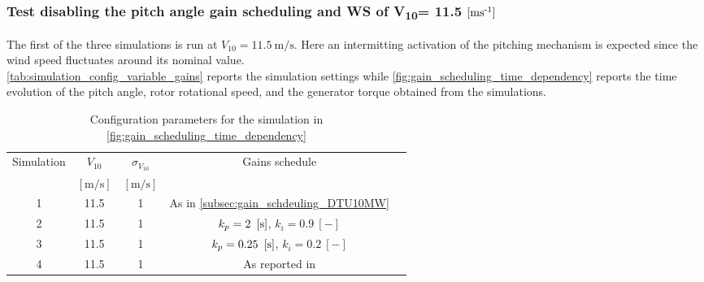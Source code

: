 \subsubsection[$V_{10}=11.5 \, \si{\meter\per\second}$]{Test disabling the pitch angle gain scheduling and WS of V\textsubscript{10}= 11.5 $\left[ \text{ms}\textsuperscript{-1} \right]$}
The first of the three simulations is run at $V_{10} = 11.5 \ \si{\meter\per\second}$. Here an intermitting activation of the pitching mechanism is expected since the wind speed fluctuates around its nominal value.\\
\autoref{tab:simulation_config_variable_gains} reports the simulation settings while \autoref{fig:gain_scheduling_time_dependency} reports the time evolution of the pitch angle, rotor rotational speed, and the generator torque obtained from the simulations. 

\begin{table}[htb]
  \caption{Configuration parameters for the simulation in \autoref{fig:gain_scheduling_time_dependency}}
  \centering
  \begin{tabular}{ccccc}
  \toprule
    Simulation & $V_{10}$  & $\sigma_{V_{10}}$ & Gains schedule \\ 
     & $\left[\si{\meter\per\second}\right]$ & $\left[\si{\meter\per\second}\right]$ & \\ \midrule       
     1 & 11.5 & 1 & As in \autoref{subsec:gain_schdeuling_DTU10MW}  \\
     2 & 11.5 & 1 & $k_p = 2 \ \mesunt{\second}$, $k_i=0.9 \ [-]$ \\
     3 & 11.5 & 1 & $k_p = 0.25 \ \mesunt{\second}$, $k_i=0.2 \ [-]$  \\
     4 & 11.5 & 1 & As reported in \cite{Olimpo_Anaya‐Lara}  \\
     \bottomrule
  \end{tabular}
  \label{tab:simulation_config_variable_gains}
\end{table}

